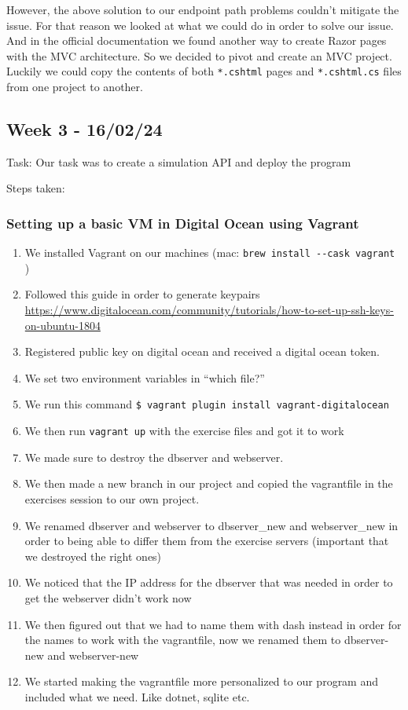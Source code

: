 However, the above solution to our endpoint path problems couldn't mitigate the issue. For that reason we looked at what we could do in order to solve our issue. And in the official documentation we found another way to create Razor pages with the MVC architecture. So we decided to pivot and create an MVC project. Luckily we could copy the contents of both \texttt{*.cshtml} pages and \texttt{*.cshtml.cs} files from one project to another.

\subsection{Week 3 - 16/02/24}
\label{log:week3}

Task: Our task was to create a simulation API and deploy the program

Steps taken:

\subsubsection{Setting up a basic VM in Digital Ocean using Vagrant}
\label{log:setting-up-a-basic-vm-in-digital-ocean-using-vagrant}

\begin{enumerate}
    \item We installed Vagrant on our machines (mac: \texttt{brew\ install\ -\/-cask\ vagrant} )
    \item Followed this guide in order to generate keypairs \url{https://www.digitalocean.com/community/tutorials/how-to-set-up-ssh-keys-on-ubuntu-1804}
    \item Registered public key on digital ocean and received a digital ocean token.
    \item We set two environment variables in ``which file?''
    \item We run this command \texttt{\$\ vagrant\ plugin\ install\ vagrant-digitalocean}
    \item We then run \texttt{vagrant\ up} with the exercise files and got it to work
    \item We made sure to destroy the dbserver and webserver.
    \item We then made a new branch in our project and copied the vagrantfile in the exercises session to our own project.
    \item We renamed dbserver and webserver to dbserver\_new and webserver\_new in order to being able to differ them from the exercise servers (important that we destroyed the right ones)
    \item We noticed that the IP address for the dbserver that was needed in order to get the webserver didn't work now
    \item We then figured out that we had to name them with dash instead in order for the names to work with the vagrantfile, now we renamed them to dbserver-new and webserver-new
    \item We started making the vagrantfile more personalized to our program and included what we need. Like dotnet, sqlite etc.
\end{enumerate}

